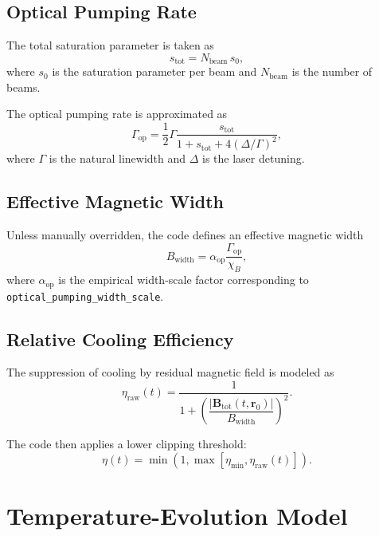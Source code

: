 \documentclass[12pt,a4paper]{article}
\begin{document}
\subsection{Optical Pumping Rate}

The total saturation parameter is taken as
\begin{equation}
  s_{\mathrm{tot}} = N_{\mathrm{beam}}\,s_0,
\end{equation}
where $s_0$ is the saturation parameter per beam and $N_{\mathrm{beam}}$ is the number of beams.

The optical pumping rate is approximated as
\begin{equation}
  \Gamma_{\mathrm{op}}
  =
  \frac{1}{2}\Gamma
  \frac{s_{\mathrm{tot}}}{1+s_{\mathrm{tot}}+4(\Delta/\Gamma)^2},
\end{equation}
where $\Gamma$ is the natural linewidth and $\Delta$ is the laser detuning.

\subsection{Effective Magnetic Width}

Unless manually overridden, the code defines an effective magnetic width
\begin{equation}
  B_{\mathrm{width}}
  =
  \alpha_{\mathrm{op}}
  \frac{\Gamma_{\mathrm{op}}}{\chi_B},
\end{equation}
where $\alpha_{\mathrm{op}}$ is the empirical width-scale factor corresponding to \texttt{optical\_pumping\_width\_scale}.

\subsection{Relative Cooling Efficiency}

The suppression of cooling by residual magnetic field is modeled as
\begin{equation}
  \eta_{\mathrm{raw}}(t)
  =
  \frac{1}{1+\left(\dfrac{|\bm{B}_{\mathrm{tot}}(t,\bm{r}_0)|}{B_{\mathrm{width}}}\right)^2}.
\end{equation}

The code then applies a lower clipping threshold:
\begin{equation}
  \eta(t)
  =
  \min\!\left(1,\max\!\left[\eta_{\min}, \eta_{\mathrm{raw}}(t)\right]\right).
\end{equation}

\section{Temperature-Evolution Model}
\end{document}
